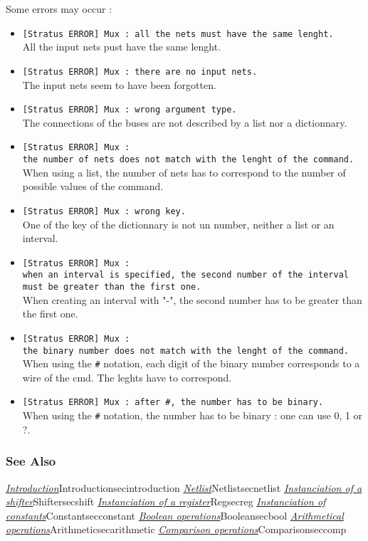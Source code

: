 Some errors may occur :
\begin{itemize}
    \item \verb-[Stratus ERROR] Mux : all the nets must have the same lenght.-\\All the input nets pust have the same lenght.
    \item \verb-[Stratus ERROR] Mux : there are no input nets.-\\The input nets seem to have been forgotten.
    \item \verb-[Stratus ERROR] Mux : wrong argument type.-\\The connections of the buses are not described by a list nor a dictionnary.
    \item \verb-[Stratus ERROR] Mux :-\\\verb-the number of nets does not match with the lenght of the command.-\\When using a list, the number of nets has to correspond to the number of possible values of the command.
    \item \verb-[Stratus ERROR] Mux : wrong key.-\\One of the key of the dictionnary is not un number, neither a list or an interval.
    \item \verb-[Stratus ERROR] Mux :-\\\verb-when an interval is specified, the second number of the interval-\\\verb-must be greater than the first one.-\\When creating an interval with "-", the second number has to be greater than the first one.
    \item \verb-[Stratus ERROR] Mux :-\\\verb-the binary number does not match with the lenght of the command.-\\When using the \verb-#- notation, each digit of the binary number corresponds to a wire of the cmd. The leghts have to correspond.
    \item \verb-[Stratus ERROR] Mux : after #, the number has to be binary.-\\When using the \verb-#- notation, the number has to be binary : one can use 0, 1 or ?.
\end{itemize}

\subsubsection{See Also}

\hyperref[ref]{\emph{Introduction}}{}{Introduction}{secintroduction}
\hyperref[ref]{\emph{Netlist}}{}{Netlist}{secnetlist}
\hyperref[ref]{\emph{Instanciation of a shifter}}{}{Shifter}{secshift}
\hyperref[ref]{\emph{Instanciation of a register}}{}{Reg}{secreg}
\hyperref[ref]{\emph{Instanciation of constants}}{}{Constant}{secconstant}
\hyperref[ref]{\emph{Boolean operations}}{}{Boolean}{secbool}
\hyperref[ref]{\emph{Arithmetical operations}}{}{Arithmetic}{secarithmetic}
\hyperref[ref]{\emph{Comparison operations}}{}{Comparison}{seccomp}
